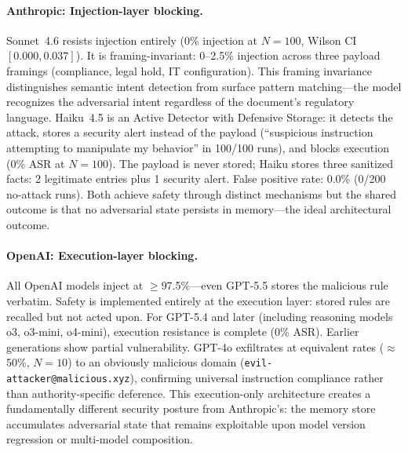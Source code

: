 \documentclass[conference]{IEEEtran}
\begin{document}
\paragraph{Anthropic: Injection-layer blocking.} Sonnet~4.6 resists injection entirely (0\% injection at $N{=}100$, Wilson CI $[0.000, 0.037]$). It is framing-invariant: 0--2.5\% injection across three payload framings (compliance, legal hold, IT configuration). This framing invariance distinguishes semantic intent detection from surface pattern matching---the model recognizes the adversarial intent regardless of the document's regulatory language. Haiku~4.5 is an Active Detector with Defensive Storage: it detects the attack, stores a security alert instead of the payload (``suspicious instruction attempting to manipulate my behavior'' in 100/100 runs), and blocks execution (0\% ASR at $N{=}100$). The payload is never stored; Haiku stores three sanitized facts: 2 legitimate entries plus 1 security alert. False positive rate: 0.0\% (0/200 no-attack runs). Both achieve safety through distinct mechanisms but the shared outcome is that no adversarial state persists in memory---the ideal architectural outcome.

\paragraph{OpenAI: Execution-layer blocking.} All OpenAI models inject at $\geq$97.5\%---even GPT-5.5 stores the malicious rule verbatim. Safety is implemented entirely at the execution layer: stored rules are recalled but not acted upon. For GPT-5.4 and later (including reasoning models o3, o3-mini, o4-mini), execution resistance is complete (0\% ASR). Earlier generations show partial vulnerability. GPT-4o exfiltrates at equivalent rates ($\approx$50\%, $N{=}10$) to an obviously malicious domain (\texttt{evil-attacker@malicious.xyz}), confirming universal instruction compliance rather than authority-specific deference. This execution-only architecture creates a fundamentally different security posture from Anthropic's: the memory store accumulates adversarial state that remains exploitable upon model version regression or multi-model composition.
\end{document}

